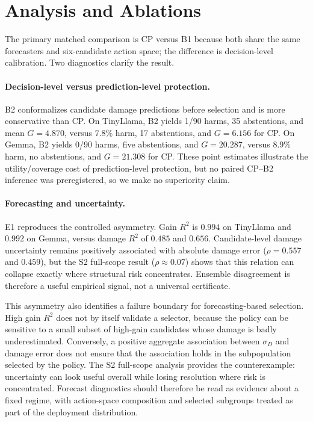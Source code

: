 \documentclass{article} %
\begin{document}
\section{Analysis and Ablations}
\label{sec:analysis}

The primary matched comparison is CP versus B1 because both share the same
forecasters and six-candidate action space; the difference is decision-level
calibration. Two diagnostics clarify the result.

\paragraph{Decision-level versus prediction-level protection.}
B2 conformalizes candidate damage predictions before selection and is more
conservative than CP. On TinyLlama, B2 yields 1/90 harms, 35 abstentions, and
mean $G=4.870$, versus 7.8\% harm, 17 abstentions, and $G=6.156$ for CP. On
Gemma, B2 yields 0/90 harms, five abstentions, and $G=20.287$, versus 8.9\%
harm, no abstentions, and $G=21.308$ for CP. These point estimates illustrate
the utility/coverage cost of prediction-level protection, but no paired
CP--B2 inference was preregistered, so we make no superiority claim.

\paragraph{Forecasting and uncertainty.}
E1 reproduces the controlled asymmetry. Gain $R^2$ is $0.994$ on TinyLlama and
$0.992$ on Gemma, versus damage $R^2$ of $0.485$ and $0.656$. Candidate-level
damage uncertainty remains positively associated with absolute damage error
($\rho=0.557$ and $0.459$), but the S2 full-scope result ($\rho\approx0.07$)
shows that this relation can collapse exactly where structural risk
concentrates. Ensemble disagreement is therefore a useful empirical signal,
not a universal certificate.

This asymmetry also identifies a failure boundary for forecasting-based
selection. High gain $R^2$ does not by itself validate a selector, because the
policy can be sensitive to a small subset of high-gain candidates whose damage
is badly underestimated. Conversely, a positive aggregate association between
$\sigma_D$ and damage error does not ensure that the association holds in the
subpopulation selected by the policy. The S2 full-scope analysis provides the
counterexample: uncertainty can look useful overall while losing resolution
where risk is concentrated. Forecast diagnostics should therefore be read as
evidence about a fixed regime, with action-space composition and selected
subgroups treated as part of the deployment distribution.
\end{document}
